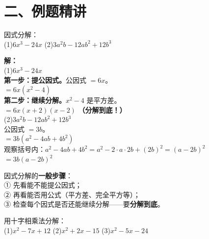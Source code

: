 \documentclass[12pt, a4paper]{ctexart}
\begin{document}
\section*{\textcolor{examorange}{二、例题精讲}}

\begin{examplebox}
因式分解：\\[3pt]
(1)\;$6x^3 - 24x$ \qquad (2)\;$3a^2b - 12ab^2 + 12b^3$
\end{examplebox}

\textbf{解：}\\[3pt]
(1)\;$6x^3 - 24x$\\
\textbf{第一步：提公因式。}公因式 $= 6x$。\\
$= 6x(x^2 - 4)$\\
\textbf{第二步：继续分解。}$x^2 - 4$ 是平方差。\\
$= 6x(x+2)(x-2)$ \quad \textbf{（分解到底！）}\\[8pt]
(2)\;$3a^2b - 12ab^2 + 12b^3$\\
公因式 $= 3b$。\\
$= 3b(a^2 - 4ab + 4b^2)$\\
观察括号内：$a^2 - 4ab + 4b^2 = a^2 - 2 \cdot a \cdot 2b + (2b)^2 = (a-2b)^2$\\
$= 3b(a-2b)^2$

\begin{tipbox}[方法总结]
因式分解的\textbf{一般步骤}：\\
① 先看能不能提公因式；\\
② 再看能否用公式（平方差、完全平方等）；\\
③ 检查每个因式是否还能继续分解——要\textbf{分解到底}。
\end{tipbox}

\begin{examplebox}
用十字相乘法分解：\\[3pt]
(1)\;$x^2 - 7x + 12$ \qquad (2)\;$x^2 + 2x - 15$ \qquad (3)\;$x^2 - 5x - 24$
\end{examplebox}
\end{document}
